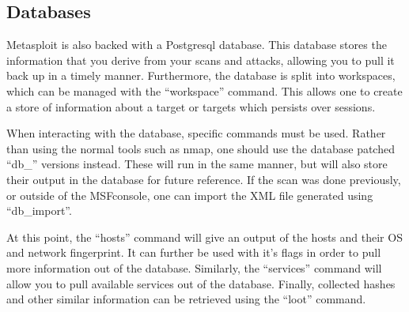 			\subsection{Databases}
				Metasploit is also backed with a Postgresql database.
				This database stores the information that you derive from your scans and attacks, allowing you to pull it back up in a timely manner.
				Furthermore, the database is split into workspaces, which can be managed with the ``workspace'' command.
				This allows one to create a store of information about a target or targets which persists over sessions.

				When interacting with the database, specific commands must be used.
				Rather than using the normal tools such as nmap, one should use the database patched ``db\_'' versions instead.
				These will run in the same manner, but will also store their output in the database for future reference.
				If the scan was done previously, or outside of the MSFconsole, one can import the XML file generated using ``db\_import''.

				At this point, the ``hosts'' command will give an output of the hosts and their OS and network fingerprint.
				It can further be used with it's flags in order to pull more information out of the database.
				Similarly, the ``services'' command will allow you to pull available services out of the database.
				Finally, collected hashes and other similar information can be retrieved using the ``loot'' command.


